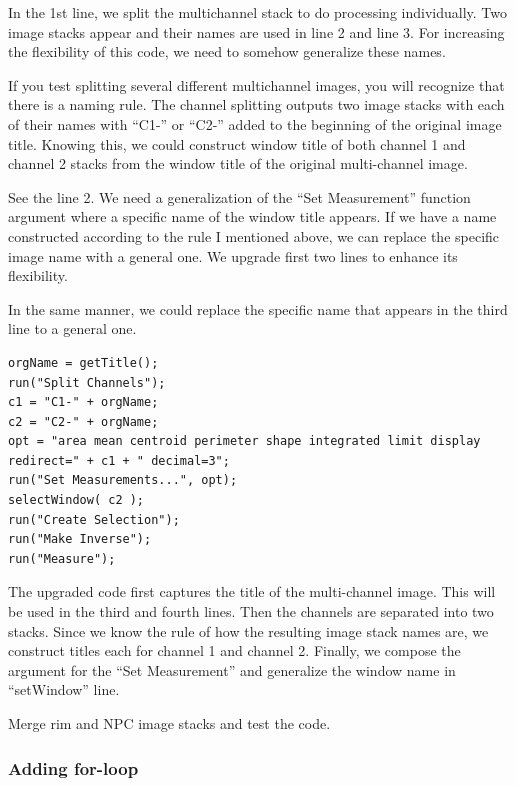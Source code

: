 In the 1st line, we split the multichannel stack to do processing individually. Two image stacks appear and their names are used in line 2 and line 3. For increasing the flexibility of this code, we need to somehow generalize these names. 

If you test splitting several different multichannel images, you will recognize that there is a naming rule. The channel splitting outputs two image stacks with each of their names with ``C1-'' or ``C2-'' added to the beginning of the original image title. Knowing this, we could construct window title of both channel 1 and channel 2 stacks from the window title of the original multi-channel image. 

See the line 2. We need a generalization of the ``Set Measurement'' function argument where a specific name of the window title appears. If we have a name constructed according to the rule I mentioned above, we can replace the specific image name with a general one. We upgrade first two lines to enhance its flexibility. 

In the same manner, we could replace the specific name that appears in the third line to a general one. 

\begin{lstlisting}[morekeywords={*, c1, c2, opt, getTitle}]
orgName = getTitle();
run("Split Channels");
c1 = "C1-" + orgName;
c2 = "C2-" + orgName;
opt = "area mean centroid perimeter shape integrated limit display redirect=" + c1 + " decimal=3";
run("Set Measurements...", opt);
selectWindow( c2 );
run("Create Selection");
run("Make Inverse");
run("Measure");
\end{lstlisting}

The upgraded code first captures the title of the multi-channel image. This will be used in the third and fourth lines. Then the channels are separated into two stacks. Since we know the rule of how the resulting image stack names are, we construct titles each for channel 1 and channel 2. Finally,  we compose the argument for the ``Set Measurement'' and generalize the window name in ``setWindow'' line. 

\begin{indentexercise}{1}
Merge rim and NPC image stacks and test the code. 
\end{indentexercise}

\subsubsection{Adding for-loop}

